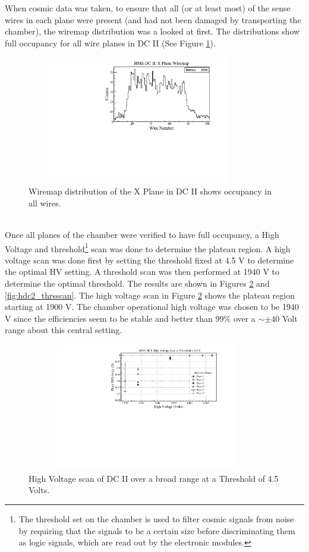 \documentclass[letterpaper, 10 pt, conference]{ieeeconf}  %
\begin{document}
When cosmic data was taken, to ensure that all (or at least most) of the sense wires in each plane were present (and had not been damaged by transporting the chamber), the wiremap distribution was
a looked at first. The distributions show full occupancy for all wire planes in DC II (See Figure \ref{fig:hdc2_wiremap}).  
\begin{figure}[h!]
  \centering
  \includegraphics[width=3.8in, height=2.2in]{dc2_tests/hdc2_xmap.pdf}
  \caption{Wiremap distribution of the X Plane in DC II shows occupancy in all wires.}
  \label{fig:hdc2_wiremap}
\end{figure} \\
Once all planes of the chamber were verified to have full occupancy, a High Voltage and threshold\footnote{The threshold set on the chamber is used to filter cosmic signals from noise by requiring that
the signals to be a certain size before discriminating them as logic signals, which are read out by the electronic modules.} scan was done to determine the plateau region. A high voltage scan was done first
by setting the threshold fixed at 4.5 V to determine the optimal HV setting. A threshold scan was then performed at 1940 V to determine the optimal threshold. The results are shown in Figures \ref{fig:hdc2_hvscan}
and \ref{fig:hdc2_thrsscan}. The high voltage scan in Figure \ref{fig:hdc2_hvscan} shows the plateau region starting at 1900 V. The chamber operational high voltage was chosen to be 1940 V since the efficiencies seem
to be stable and better than 99$\%$ over a $\sim\pm$40 Volt range about this central setting.
\begin{figure}[h!]
  \centering
  \includegraphics[width=4.1in, height=2.2in]{dc2_tests/dc2_hvscan_thrs45.pdf}
  \caption{High Voltage scan of DC II over a broad range at a Threshold of 4.5 Volts.}
  \label{fig:hdc2_hvscan}
\end{figure} 
\end{document}
